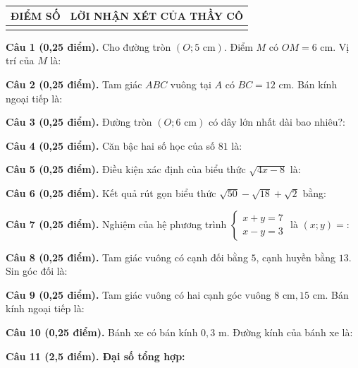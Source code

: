\documentclass[12pt,a4paper]{article}
\begin{document}
\vspace{1.0mm}

\noindent
\begin{tabularx}{\linewidth}{|p{3.2cm}|X|}
\hline
\centering\textbf{ĐIỂM SỐ} & \centering\textbf{LỜI NHẬN XÉT CỦA THẦY CÔ} \tabularnewline
\hline
\rule{0pt}{1.8cm} & \tabularnewline
\hline
\end{tabularx}

\vspace{1.2mm}
\noindent\textbf{Câu 1 (0,25 điểm).} Cho đường tròn $(O; 5\text{ cm})$. Điểm $M$ có $OM = 6\text{ cm}$. Vị trí của $M$ là: \par\vspace{0.6mm}
\noindent\textbf{Câu 2 (0,25 điểm).} Tam giác $ABC$ vuông tại $A$ có $BC = 12\text{ cm}$. Bán kính ngoại tiếp là: \par\vspace{0.6mm}
\noindent\textbf{Câu 3 (0,25 điểm).} Đường tròn $(O; 6\text{ cm})$ có dây lớn nhất dài bao nhiêu?: \par\vspace{0.6mm}
\noindent\textbf{Câu 4 (0,25 điểm).} Căn bậc hai số học của số $81$ là: \par\vspace{0.6mm}
\noindent\textbf{Câu 5 (0,25 điểm).} Điều kiện xác định của biểu thức $\sqrt{4x - 8}$ là: \par\vspace{0.6mm}
\noindent\textbf{Câu 6 (0,25 điểm).} Kết quả rút gọn biểu thức $\sqrt{50} - \sqrt{18} + \sqrt{2}$ bằng: \par\vspace{0.6mm}
\noindent\textbf{Câu 7 (0,25 điểm).} Nghiệm của hệ phương trình $\begin{cases} x + y = 7 \\ x - y = 3 \end{cases}$ là $(x; y) = $: \par\vspace{0.6mm}
\noindent\textbf{Câu 8 (0,25 điểm).} Tam giác vuông có cạnh đối bằng $5$, cạnh huyền bằng $13$. Sin góc đối là: \par\vspace{0.6mm}
\noindent\textbf{Câu 9 (0,25 điểm).} Tam giác vuông có hai cạnh góc vuông $8\text{ cm}, 15\text{ cm}$. Bán kính ngoại tiếp là: \par\vspace{0.6mm}
\noindent\textbf{Câu 10 (0,25 điểm).} Bánh xe có bán kính $0{,}3\text{ m}$. Đường kính của bánh xe là: \par\vspace{0.6mm}
\vspace{0.8mm}
\noindent\textbf{Câu 11 (2,5 điểm). Đại số tổng hợp:}
\vspace{0.6mm}
\end{document}
